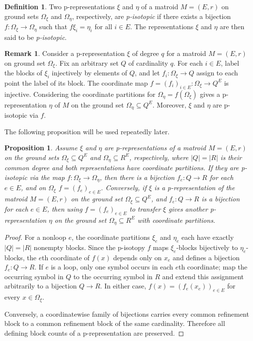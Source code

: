\documentclass[preprint,12pt]{elsarticle}
\newtheorem{proposition}[theorem]{Proposition}
\theoremstyle{definition}
\newtheorem{definition}[theorem]{Definition}
\newtheorem{remark}[theorem]{Remark}
\begin{document}
\begin{definition}
	Two p-representations $\xi$ and $\eta$ of a matroid $M = (E,r)$ on ground sets $\Omega_{\xi}$ and $\Omega_{\eta}$, respectively, are \emph{p-isotopic} if 
	there exists a bijection $f: \Omega_{\xi} \rightarrow  \Omega_{\eta}$ such that
	$f\xi_i = \eta_i$ for all $i \in E$. The representations $\xi$ and $\eta$ are then said to be \emph{p-isotopic}.
\end{definition}

\begin{remark}\label{rem: transforming to subset of cartesian}
	Consider a p-representation $\xi$ of degree $q$ for a matroid $M = (E,r)$ on 
	ground set $\Omega_{\xi}$. Fix an arbitrary set $Q$ of cardinality $q$. For each $i\in E$, label the blocks of $\xi_i$ injectively by elements of $Q$, and let $f_i:\Omega_\xi\to Q$ assign to each point the label of its block. The coordinate map $f=(f_i)_{i\in E}:\Omega_\xi\to Q^E$ is injective. Considering the 
	coordinate partitions for $\Omega_{\eta} = f(\Omega_{\xi})$ gives a 
	p-representation $\eta$ of $M$ on the ground set $\Omega_{\eta} \subseteq Q^E$.
	Moreover, $\xi$ and $\eta$ are p-isotopic via $f$.
\end{remark}

The following proposition will be used repeatedly later.

\begin{proposition}\label{prop: coordinate partition p-rep}
	Assume $\xi$ and $\eta$ are p-representations of a matroid $M=(E,r)$ on the ground sets
	$\Omega_{\xi} \subseteq Q^E$ and $\Omega_{\eta} \subseteq R^E$, respectively,
	where $|Q|=|R|$ is their common degree and both representations
	have coordinate partitions. If they are p-isotopic via the map
	$f:\Omega_{\xi} \rightarrow \Omega_{\eta}$, then there is a bijection
	$f_e:Q \rightarrow R$ for each $e \in E$, and on $\Omega_\xi$
	$f = (f_e)_{e \in E}$.
	Conversely, if $\xi$ is a p-representation of the matroid
	$M=(E,r)$ on the ground set $\Omega_{\xi} \subseteq Q^E$, and $f_e:Q \rightarrow R$ is a bijection for each $e \in E$, then using $f=(f_e)_{e \in E}$ to transfer $\xi$ gives another p-representation $\eta$ on the ground set
	$\Omega_{\eta} \subseteq R^E$ with coordinate partitions. 
\end{proposition}

\begin{proof}
For a nonloop $e$, the coordinate partitions $\xi_e$ and
$\eta_e$ each have exactly $|Q|=|R|$ nonempty blocks. Since the p-isotopy
$f$ maps $\xi_e$-blocks bijectively to $\eta_e$-blocks, the $e$th coordinate
of $f(x)$ depends only on $x_e$ and defines a bijection $f_e:Q\to R$. If $e$
is a loop, only one symbol occurs in each $e$th coordinate; map the occurring
symbol in $Q$ to the occurring symbol in $R$ and extend this assignment
arbitrarily to a bijection $Q\to R$. In either case,
$f(x)=(f_e(x_e))_{e\in E}$ for every $x\in\Omega_\xi$.

Conversely, a coordinatewise family of bijections carries every common
refinement block to a common refinement block of the same cardinality.
Therefore all defining block counts of a p-representation are preserved.
\end{proof}
\end{document}
